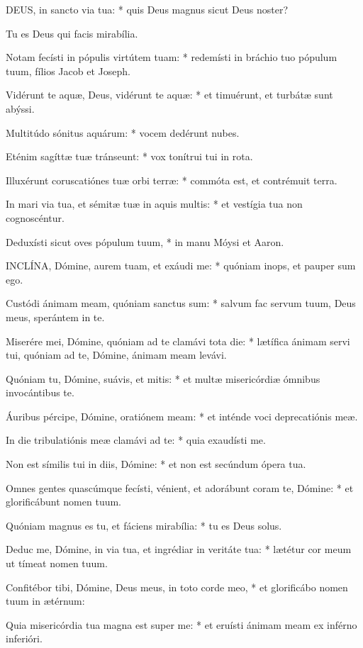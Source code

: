 
\lettrine[lines=2]{D}{EUS}, in sancto via tua: * quis Deus magnus sicut Deus noster?

Tu es Deus qui facis mirabília.

Notam fecísti in pópulis virtútem tuam: * redemísti in bráchio tuo pópulum tuum, fílios Jacob et Joseph.

Vidérunt te aquæ, Deus, vidérunt te aquæ: * et timuérunt, et turbátæ sunt abýssi.

Multitúdo sónitus aquárum: * vocem dedérunt nubes.

Eténim sagíttæ tuæ tránseunt: * vox tonítrui tui in rota.

Illuxérunt coruscatiónes tuæ orbi terræ: * commóta est, et contrémuit terra.

In mari via tua, et sémitæ tuæ in aquis multis: * et vestígia tua non cognoscéntur.

Deduxísti sicut oves pópulum tuum, * in manu Móysi et Aaron.


\lettrine[lines=2]{I}{NCLÍNA}, Dómine, aurem tuam, et exáudi me: * quóniam inops, et pauper sum ego.

Custódi ánimam meam, quóniam sanctus sum: * salvum fac servum tuum, Deus meus, sperántem in te.

Miserére mei, Dómine, quóniam ad te clamávi tota die: * lætífica ánimam servi tui, quóniam ad te, Dómine, ánimam meam levávi.

Quóniam tu, Dómine, suávis, et mitis: * et multæ misericórdiæ ómnibus invocántibus te.

Áuribus pércipe, Dómine, oratiónem meam: * et inténde voci deprecatiónis meæ.

In die tribulatiónis meæ clamávi ad te: * quia exaudísti me.

Non est símilis tui in diis, Dómine: * et non est secúndum ópera tua.

Omnes gentes quascúmque fecísti, vénient, et adorábunt coram te, Dómine: * et glorificábunt nomen tuum.

Quóniam magnus es tu, et fáciens mirabília: * tu es Deus solus.

Deduc me, Dómine, in via tua, et ingrédiar in veritáte tua: * lætétur cor meum ut tímeat nomen tuum.

Confitébor tibi, Dómine, Deus meus, in toto corde meo, * et glorificábo nomen tuum in ætérnum:

Quia misericórdia tua magna est super me: * et eruísti ánimam meam ex inférno inferióri.


